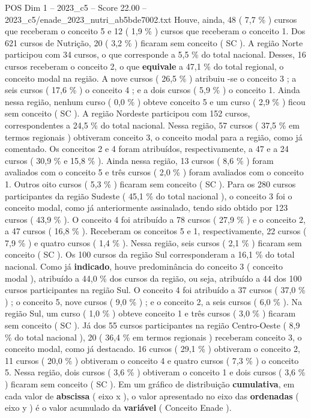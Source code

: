 \begin{textsample}{POS Dim 1 – 2023\_c5 – Score 22.00 – 2023\_c5/enade\_2023\_nutri\_ab5bde7002.txt}
Houve, ainda, 48 ( 7,7 \% ) cursos que receberam o conceito 5 e 12 ( 1,9 \% ) cursos que receberam o conceito 1.
Dos 621 cursos de Nutrição, 20 ( 3,2 \% ) ficaram sem conceito ( SC ).
A região Norte participou com 34 cursos, o que corresponde a 5,5 \% do total nacional.
Desses, 16 cursos receberam o conceito 2, o que \textbf{equivale} a 47,1 \% do total regional, o conceito modal na região.
A nove cursos ( 26,5 \% ) atribuiu -se o conceito 3 ; a seis cursos ( 17,6 \% ) o conceito 4 ; e a dois cursos ( 5,9 \% ) o conceito 1.
Ainda nessa região, nenhum curso ( 0,0 \% ) obteve conceito 5 e um curso ( 2,9 \% ) ficou sem conceito ( SC ).
A região Nordeste participou com 152 cursos, correspondentes a 24,5 \% do total nacional.
Nessa região, 57 cursos ( 37,5 \% em termos regionais ) obtiveram conceito 3, o conceito modal para a região, como já comentado.
Os conceitos 2 e 4 foram atribuídos, respectivamente, a 47 e a 24 cursos ( 30,9 \% e 15,8 \% ).
Ainda nessa região, 13 cursos ( 8,6 \% ) foram avaliados com o conceito 5 e três cursos ( 2,0 \% ) foram avaliados com o conceito 1.
Outros oito cursos ( 5,3 \% ) ficaram sem conceito ( SC ).
Para os 280 cursos participantes da região Sudeste ( 45,1 \% do total nacional ), o conceito 3 foi o conceito modal, como já anteriormente assinalado, tendo sido obtido por 123 cursos ( 43,9 \% ).
O conceito 4 foi atribuído a 78 cursos ( 27,9 \% ) e o conceito 2, a 47 cursos ( 16,8 \% ).
Receberam os conceitos 5 e 1, respectivamente, 22 cursos ( 7,9 \% ) e quatro cursos ( 1,4 \% ).
Nessa região, seis cursos ( 2,1 \% ) ficaram sem conceito ( SC ).
Os 100 cursos da região Sul corresponderam a 16,1 \% do total nacional.
Como já \textbf{indicado}, houve predominância do conceito 3 ( conceito modal ), atribuído a 44,0 \% dos cursos da região, ou seja, atribuído a 44 dos 100 cursos participantes na região Sul.
O conceito 4 foi atribuído a 37 cursos ( 37,0 \% ) ; o conceito 5, nove cursos ( 9,0 \% ) ; e o conceito 2, a seis cursos ( 6,0 \% ).
Na região Sul, um curso ( 1,0 \% ) obteve conceito 1 e três cursos ( 3,0 \% ) ficaram sem conceito ( SC ).
Já dos 55 cursos participantes na região Centro-Oeste ( 8,9 \% do total nacional ), 20 ( 36,4 \% em termos regionais ) receberam conceito 3, o conceito modal, como já destacado. 16 cursos ( 29,1 \% ) obtiveram o conceito 2, 11 cursos ( 20,0 \% ) obtiveram o conceito 4 e quatro cursos ( 7,3 \% ) o conceito 5.
Nessa região, dois cursos ( 3,6 \% ) obtiveram o conceito 1 e dois cursos ( 3,6 \% ) ficaram sem conceito ( SC ).
Em um gráfico de distribuição \textbf{cumulativa}, em cada valor de \textbf{abscissa} ( eixo x ), o valor apresentado no eixo das \textbf{ordenadas} ( eixo y ) é o valor acumulado da \textbf{variável} ( Conceito Enade ).

\end{textsample}
